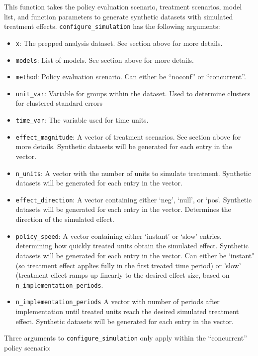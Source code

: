 \documentclass[
]{article}
\begin{document}
This function takes the policy evaluation scenario, treatment scenarios,
model list, and function parameters to generate synthetic datasets with
simulated treatment effects. \texttt{configure\_simulation} has the
following arguments:

\begin{itemize}
\item
  \texttt{x}: The prepped analysis dataset. See section above for more
  details.
\item
  \texttt{models}: List of models. See section above for more details.
\item
  \texttt{method}: Policy evaluation scenario. Can either be ``noconf''
  or ``concurrent''.
\item
  \texttt{unit\_var}: Variable for groups within the dataset. Used to
  determine clusters for clustered standard errors
\item
  \texttt{time\_var}: The variable used for time units.
\item
  \texttt{effect\_magnitude}: A vector of treatment scenarios. See
  section above for more details. Synthetic datasets will be generated
  for each entry in the vector.
\item
  \texttt{n\_units}: A vector with the number of units to simulate
  treatment. Synthetic datasets will be generated for each entry in the
  vector.
\item
  \texttt{effect\_direction}: A vector containing either `neg', `null',
  or `pos'. Synthetic datasets will be generated for each entry in the
  vector. Determines the direction of the simulated effect.
\item
  \texttt{policy\_speed}: A vector containing either `instant' or `slow'
  entries, determining how quickly treated units obtain the simulated
  effect. Synthetic datasets will be generated for each entry in the
  vector. Can either be `instant" (so treatment effect applies fully in
  the first treated time period) or 'slow' (treatment effect ramps up
  linearly to the desired effect size, based on
  \texttt{n\_implementation\_periods}.
\item
  \texttt{n\_implementation\_periods} A vector with number of periods
  after implementation until treated units reach the desired simulated
  treatment effect. Synthetic datasets will be generated for each entry
  in the vector.
\end{itemize}

Three arguments to \texttt{configure\_simulation} only apply within the
``concurrent'' policy scenario:
\end{document}
